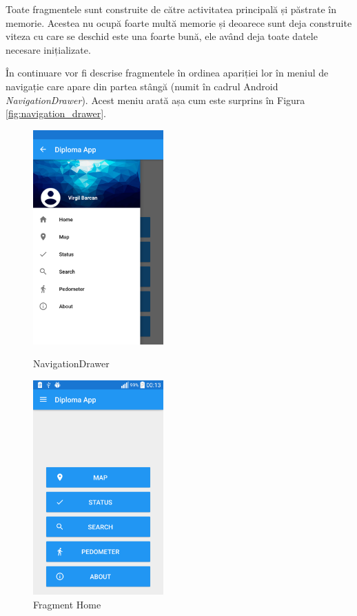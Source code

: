 \documentclass[12pt, a4paper, oneside]{article}
\begin{document}
Toate fragmentele sunt construite de către activitatea principală și păstrate în memorie. Acestea nu ocupă foarte multă memorie și deoarece sunt deja construite viteza cu care se deschid este una foarte bună, ele având deja toate datele necesare inițializate.

În continuare vor fi descrise fragmentele în ordinea apariției lor în meniul de navigație care apare din partea stângă (numit în cadrul Android \textit{NavigationDrawer}). Acest meniu arată așa cum este surprins în Figura \ref{fig:navigation_drawer}.

\begin{figure}[!htb]
  \centering
  \includegraphics[width=5cm]{figures/navigation_drawer.png}
  \caption{NavigationDrawer}
  \label{fig:navigation_drawer}
\endminipage\hfill
{}%
  \centering  
  \includegraphics[width=5cm]{figures/fragment_home.png}
  \caption{Fragment Home}
  \label{fig:fragment_home}
\endminipage
\end{figure}
\end{document}
